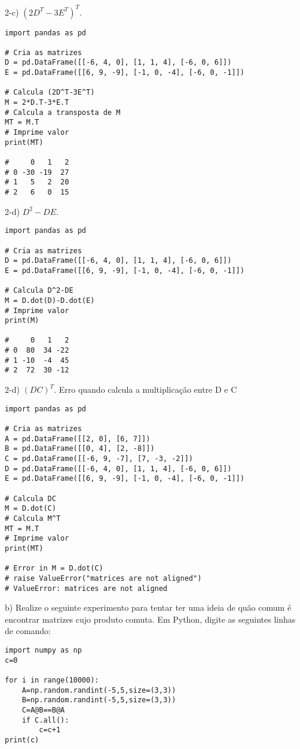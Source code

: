 2-c) $(2D^T-3E^T)^T$.
\\

\begin{lstlisting}
import pandas as pd

# Cria as matrizes
D = pd.DataFrame([[-6, 4, 0], [1, 1, 4], [-6, 0, 6]])
E = pd.DataFrame([[6, 9, -9], [-1, 0, -4], [-6, 0, -1]])
    
# Calcula (2D^T-3E^T)
M = 2*D.T-3*E.T
# Calcula a transposta de M
MT = M.T
# Imprime valor
print(MT)
    
#     0   1   2
# 0 -30 -19  27
# 1   5   2  20
# 2   6   0  15
\end{lstlisting}


2-d) $D^2-DE$.
\\

\begin{lstlisting}
import pandas as pd

# Cria as matrizes
D = pd.DataFrame([[-6, 4, 0], [1, 1, 4], [-6, 0, 6]])
E = pd.DataFrame([[6, 9, -9], [-1, 0, -4], [-6, 0, -1]])
    
# Calcula D^2-DE
M = D.dot(D)-D.dot(E)
# Imprime valor
print(M)
    
#     0   1   2
# 0  80  34 -22
# 1 -10  -4  45
# 2  72  30 -12
\end{lstlisting}


2-d) $(DC)^T$. Erro quando calcula a multiplicação entre D e C
\\

\begin{lstlisting}
import pandas as pd

# Cria as matrizes
A = pd.DataFrame([[2, 0], [6, 7]])
B = pd.DataFrame([[0, 4], [2, -8]])
C = pd.DataFrame([[-6, 9, -7], [7, -3, -2]])
D = pd.DataFrame([[-6, 4, 0], [1, 1, 4], [-6, 0, 6]])
E = pd.DataFrame([[6, 9, -9], [-1, 0, -4], [-6, 0, -1]])

# Calcula DC
M = D.dot(C)
# Calcula M^T
MT = M.T
# Imprime valor
print(MT)

# Error in M = D.dot(C)
# raise ValueError("matrices are not aligned")
# ValueError: matrices are not aligned
\end{lstlisting}


b) Realize o seguinte experimento para tentar ter uma ideia de quão comum é encontrar matrizes cujo produto comuta. Em Python, digite as seguintes linhas de comando:
\\

\begin{lstlisting}
import numpy as np
c=0

for i in range(10000):
    A=np.random.randint(-5,5,size=(3,3))
    B=np.random.randint(-5,5,size=(3,3))
    C=A@B==B@A
    if C.all():
        c=c+1
print(c)    
\end{lstlisting}


